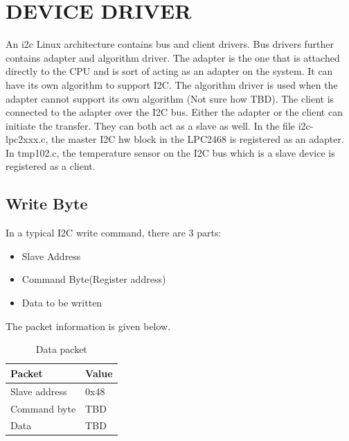 \documentclass{article}
\begin{document}
\section{DEVICE DRIVER}
An i2c Linux architecture contains bus and client drivers. Bus drivers further contains adapter and algorithm driver. The adapter is the one that is attached directly to the CPU and is sort of acting as an adapter on the system. It can have its own algorithm to support I2C. The algorithm driver is used when the adapter cannot support its own algorithm (Not sure how TBD). The client is connected to the adapter over the I2C bus. Either the adapter or the client can initiate the transfer. They can both act as a slave as well. In the file i2c-lpc2xxx.c, the master I2C hw block in the LPC2468 is registered as an adapter. In tmp102.c, the temperature sensor on the I2C bus which is a slave device is registered as a client.
\subsection{Write Byte}
In a typical I2C write command, there are 3 parts: 
\begin{itemize}
\item Slave Address
\item Command Byte(Register address)
\item Data to be written  
\end{itemize}
The packet information is given below.

\begin{table}[H]
\centering
 \begin{tabular}{|l|l|}
 \hline Packet & Value \\ 
 \hline Slave address & 0x48 \\
 \hline Command byte & TBD \\
 \hline Data & TBD \\
 \hline 
 \end{tabular} 
\caption{Data packet}
\end{table}

\end{document}
